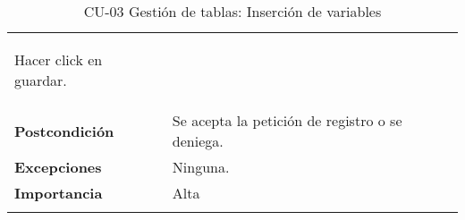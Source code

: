 \begin{longtable}[H]{@{}ll@{}}
\begin{minipage}[t]{0.71\columnwidth}
\begin{enumerate}
Hacer click en guardar.
\end{enumerate}\strut
\end{minipage}\tabularnewline
\begin{minipage}[t]{0.23\columnwidth}\raggedright\strut
\textbf{Postcondición}\strut
\end{minipage} & \begin{minipage}[t]{0.71\columnwidth}\raggedright\strut
Se acepta la petición de registro o se deniega.\strut
\end{minipage}\tabularnewline
\begin{minipage}[t]{0.23\columnwidth}\raggedright\strut
\textbf{Excepciones}\strut
\end{minipage} & \begin{minipage}[t]{0.71\columnwidth}\raggedright\strut
Ninguna. \strut
\end{minipage}\tabularnewline
\begin{minipage}[t]{0.23\columnwidth}\raggedright\strut
\textbf{Importancia}\strut
\end{minipage} & \begin{minipage}[t]{0.71\columnwidth}\raggedright\strut
Alta\strut
\end{minipage}\tabularnewline
\bottomrule
\caption{CU-03 Gestión de tablas: Inserción de variables}
\end{longtable}

